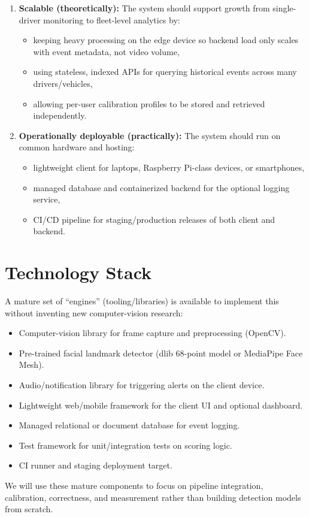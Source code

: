 \documentclass[11pt,a4paper]{article}
\begin{document}
\begin{enumerate}[leftmargin=0.7cm]
    \item \textbf{Scalable (theoretically):} The system should support growth from single-driver monitoring to fleet-level analytics by:
    \begin{itemize}[leftmargin=0.7cm]
        \item keeping heavy processing on the edge device so backend load only scales with event metadata, not video volume,
        \item using stateless, indexed APIs for querying historical events across many drivers/vehicles,
        \item allowing per-user calibration profiles to be stored and retrieved independently.
    \end{itemize}

    \item \textbf{Operationally deployable (practically):} The system should run on common hardware and hosting:
    \begin{itemize}[leftmargin=0.7cm]
        \item lightweight client for laptops, Raspberry Pi-class devices, or smartphones,
        \item managed database and containerized backend for the optional logging service,
        \item CI/CD pipeline for staging/production releases of both client and backend.
    \end{itemize}
\end{enumerate}

\section{Technology Stack}
A mature set of ``engines'' (tooling/libraries) is
available to implement this without inventing new
computer-vision research:
\begin{itemize}[leftmargin=0.7cm]
    \item Computer-vision library for frame capture and preprocessing (OpenCV).
    \item Pre-trained facial landmark detector (dlib 68-point model or MediaPipe Face Mesh).
    \item Audio/notification library for triggering alerts on the client device.
    \item Lightweight web/mobile framework for the client UI and optional dashboard.
    \item Managed relational or document database for event logging.
    \item Test framework for unit/integration tests on scoring logic.
    \item CI runner and staging deployment target.
\end{itemize}
We will use these mature components to focus on
pipeline integration, calibration, correctness, and
measurement rather than building detection models from
scratch.
\end{document}
